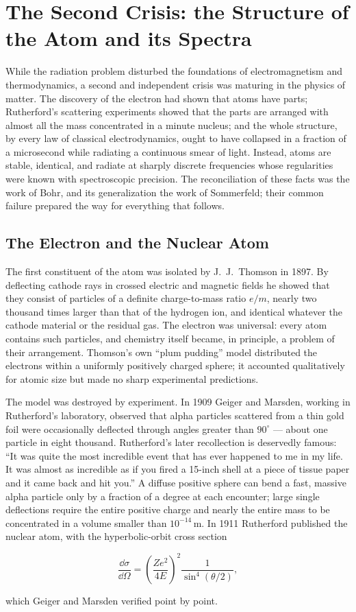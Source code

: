 \section{The Second Crisis: the Structure of the Atom and its Spectra}
While the radiation problem disturbed the foundations of electromagnetism and thermodynamics, a second and independent crisis was maturing in the physics of matter. The discovery of the electron had shown that atoms have parts; Rutherford's scattering experiments showed that the parts are arranged with almost all the mass concentrated in a minute nucleus; and the whole structure, by every law of classical electrodynamics, ought to have collapsed in a fraction of a microsecond while radiating a continuous smear of light. Instead, atoms are stable, identical, and radiate at sharply discrete frequencies whose regularities were known with spectroscopic precision. The reconciliation of these facts was the work of Bohr, and its generalization the work of Sommerfeld; their common failure prepared the way for everything that follows.

\subsection{The Electron and the Nuclear Atom}
The first constituent of the atom was isolated by J.~J.~Thomson in 1897. By deflecting cathode rays in crossed electric and magnetic fields he showed that they consist of particles of a definite charge-to-mass ratio $e/m$, nearly two thousand times larger than that of the hydrogen ion, and identical whatever the cathode material or the residual gas. The electron was universal: every atom contains such particles, and chemistry itself became, in principle, a problem of their arrangement. Thomson's own ``plum pudding'' model distributed the electrons within a uniformly positively charged sphere; it accounted qualitatively for atomic size but made no sharp experimental predictions.

The model was destroyed by experiment. In 1909 Geiger and Marsden, working in Rutherford's laboratory, observed that alpha particles scattered from a thin gold foil were occasionally deflected through angles greater than $90^\circ$ --- about one particle in eight thousand. Rutherford's later recollection is deservedly famous: ``It was quite the most incredible event that has ever happened to me in my life. It was almost as incredible as if you fired a 15-inch shell at a piece of tissue paper and it came back and hit you.'' A diffuse positive sphere can bend a fast, massive alpha particle only by a fraction of a degree at each encounter; large single deflections require the entire positive charge and nearly the entire mass to be concentrated in a volume smaller than $10^{-14}\,\mathrm{m}.$ In 1911 Rutherford published the nuclear atom, with the hyperbolic-orbit cross section
\begin{linenomath}
    \begin{equation}
        \frac{\dd\sigma}{\dd\Omega}
        =\left(\frac{Ze^2}{4E}\right)^2\frac{1}{\sin^4(\theta/2)},
    \end{equation}
\end{linenomath}
which Geiger and Marsden verified point by point.

